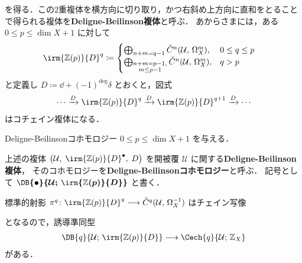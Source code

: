 \documentclass[TQFT_main]{subfiles}
\begin{document}
を得る．この2重複体を横方向に切り取り，かつ右斜め上方向に直和をとることで得られる複体を\textbf{Deligne-Beilinson複体}と呼ぶ．
あからさまには，ある $0 \le p \le \dim X + 1$ に対して
\begin{align}
    \irm{\mathbb{Z}(p)}{D}^q 
    &\coloneqq 
    \begin{cases}
        \bigoplus_{n+m = q-1} \check{C}^{n}(\mathcal{U},\, \Omega^{m}_X), &0 \le q \le p \\
        \bigoplus_{\substack{n+m = p-1,\\ m \le p-1}} \check{C}^{n}(\mathcal{U},\, \Omega^{m}_X), &q > p
    \end{cases}
\end{align}
と定義し $D \coloneqq \dd + (-1)^{\deg}\delta$ とおくと，図式
\begin{align}
    \cdots \xrightarrow{D} \irm{\mathbb{Z}(p)}{D}^q  \xrightarrow{D} \irm{\mathbb{Z}(p)}{D}^{q+1} \xrightarrow{D} \cdots
\end{align}
はコチェイン複体になる．

\begin{mydef}[label=def:Deligne-Beilinson]{Deligne-Beilinsonコホモロジー}
    $0 \le p \le \dim X + 1$ を与える．
    
    上述の複体 $\bigl(\mathcal{U},\; \irm{\mathbb{Z}(p)}{D}^\bullet,\; D \bigr)$ を開被覆 $\mathcal{U}$ に関する\textbf{Deligne-Beilinson複体}，
    そのコホモロジーを\textbf{Deligne-Beilinsonコホモロジー}と呼ぶ．
    記号として $\bm{\DB{\bullet}{\mathcal{U};\, \irm{\mathbb{Z}(p)}{D}}}$ と書く．
\end{mydef}

標準的射影 $\pi^q \colon \irm{\mathbb{Z}(p)}{D}^q \lto \check{C}^q(\mathcal{U},\, \Omega_X^{-1})$ はチェイン写像
\begin{center}
\end{center}
となるので，誘導準同型
\begin{align}
    \DB{q}{\mathcal{U};\, \irm{\mathbb{Z}(p)}{D}} \lto \Cech{q}{\mathcal{U};\, \mathbb{Z}_X}
\end{align}
がある．
\end{document}
